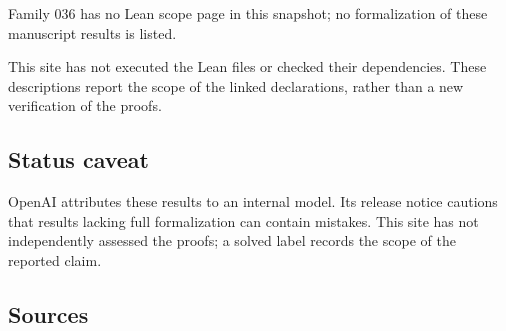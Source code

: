 \documentclass[11pt]{article}
\begin{document}
Family 036 has no Lean scope page in this snapshot; no formalization of these manuscript results is listed.

This site has not executed the Lean files or checked their dependencies. These descriptions report the scope of the linked declarations, rather than a new verification of the proofs.

\subsection{Status caveat}
OpenAI attributes these results to an internal model. Its release notice cautions that results lacking full formalization can contain mistakes. This site has not independently assessed the proofs; a solved label records the scope of the reported claim.

\subsection{Sources}
\end{document}
